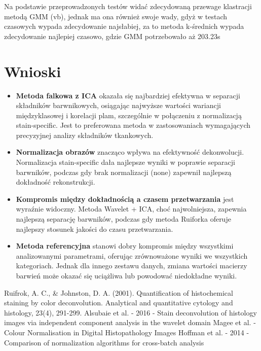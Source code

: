 \documentclass{article}
\begin{document}
Na podstawie przeprowadzonych testów widać zdecydowaną przewage klastracji metodą GMM (vb), jednak ma ona również swoje wady, gdyż w testach czasowych wypada zdecydowanie najsłabiej, za to metoda k-średnich wypada zdecydowanie najlepiej czasowo, gdzie GMM potrzebowało aż 203.23s
\FloatBarrier

\section{Wnioski}

\begin{itemize}
\item \textbf{Metoda falkowa z ICA} okazała się najbardziej efektywna w separacji składników barwnikowych, osiągając najwyższe wartości wariancji międzyklasowej i korelacji plam, szczególnie w połączeniu z normalizacją stain-specific. Jest to preferowana metoda w zastosowaniach wymagających precyzyjnej analizy składników tkankowych.

\item \textbf{Normalizacja obrazów} znacząco wpływa na efektywność dekonwolucji. Normalizacja stain-specific dała najlepsze wyniki w poprawie separacji barwników, podczas gdy brak normalizacji (none) zapewnił najlepszą dokładność rekonstrukcji.

\item \textbf{Kompromis między dokładnością a czasem przetwarzania} jest wyraźnie widoczny. Metoda Wavelet + ICA, choć najwolniejsza, zapewnia najlepszą separację barwników, podczas gdy metoda Ruiforka oferuje najlepszy stosunek jakości do czasu przetwarzania.

\item \textbf{Metoda referencyjna} stanowi dobry kompromis między wszystkimi analizowanymi parametrami, oferując zrównoważone wyniki we wszystkich kategoriach. Jednak dla innego zestawu danych, zmiana wartości macierzy barwień może okazać się uciążliwa lub powodować niedokładne wyniki.
\end{itemize}

\begin{thebibliography}{9}
Ruifrok, A. C., \& Johnston, D. A. (2001). Quantification of histochemical staining by color deconvolution. Analytical and quantitative cytology and histology, 23(4), 291-299.
Alsubaie et al. - 2016 - Stain deconvolution of histology images via independent component analysis in the wavelet domain
Magee et al. - Colour Normalisation in Digital Histopathology Images
Hoffman et al. - 2014 - Comparison of normalization algorithms for cross-batch analysis
\end{thebibliography}
\end{document}
